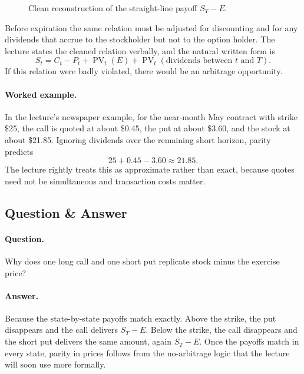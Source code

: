 \begin{figure}[h]
\centering
{}
\caption{Clean reconstruction of the straight-line payoff $S_T-E$.}
\end{figure}

Before expiration the same relation must be adjusted for discounting and for any dividends that accrue to the stockholder but not to the option holder. The lecture states the cleaned relation verbally, and the natural written form is
\begin{equation}
S_t=C_t-P_t+\operatorname{PV}_t(E)+\operatorname{PV}_t(\text{dividends between }t\text{ and }T).
\end{equation}
If this relation were badly violated, there would be an arbitrage opportunity.

\paragraph{Worked example.} In the lecture's newspaper example, for the near-month May contract with strike \$25, the call is quoted at about \$0.45, the put at about \$3.60, and the stock at about \$21.85. Ignoring dividends over the remaining short horizon, parity predicts
\begin{equation}
25+0.45-3.60 \approx 21.85.
\end{equation}
The lecture rightly treats this as approximate rather than exact, because quotes need not be simultaneous and transaction costs matter.

\subsection{Question \& Answer}

\paragraph{Question.} Why does one long call and one short put replicate stock minus the exercise price?

\paragraph{Answer.} Because the state-by-state payoffs match exactly. Above the strike, the put disappears and the call delivers $S_T-E$. Below the strike, the call disappears and the short put delivers the same amount, again $S_T-E$. Once the payoffs match in every state, parity in prices follows from the no-arbitrage logic that the lecture will soon use more formally.

